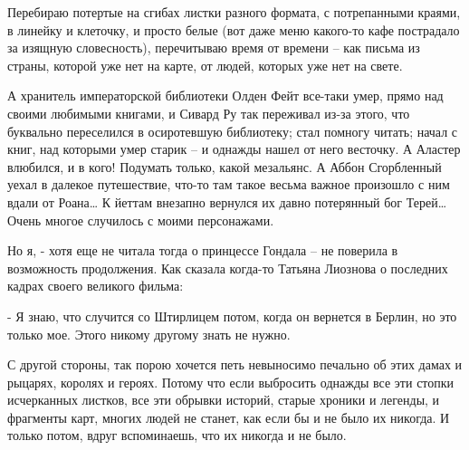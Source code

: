 Перебираю потертые на сгибах листки разного формата, с потрепанными краями, в
линейку и клеточку, и просто белые (вот даже меню какого-то кафе пострадало за
изящную словесность), перечитываю время от времени – как письма из страны,
которой уже нет на карте, от людей, которых уже нет на свете.

А хранитель императорской библиотеки Олден Фейт все-таки умер, прямо над своими
любимыми книгами, и Сивард Ру так переживал из-за этого, что буквально
переселился в осиротевшую библиотеку; стал помногу читать; начал с книг, над
которыми умер старик – и однажды нашел от него весточку. А Аластер влюбился, и
в кого! Подумать только, какой мезальянс. А Аббон Сгорбленный уехал в далекое
путешествие, что-то там такое весьма важное произошло с ним вдали от Роана… К
йеттам внезапно вернулся их давно потерянный бог Терей… Очень многое случилось
с моими персонажами.

Но я, - хотя еще не читала тогда о принцессе Гондала – не поверила в
возможность продолжения. Как сказала когда-то Татьяна Лиознова о последних
кадрах своего великого фильма: 

- Я знаю, что случится со Штирлицем потом, когда он вернется в Берлин, но это
только мое. Этого никому другому знать не нужно.

С другой стороны, так порою хочется петь невыносимо печально об этих дамах и
рыцарях, королях и героях. Потому что если выбросить однажды все эти стопки
исчерканных листков, все эти обрывки историй, старые хроники и легенды, и
фрагменты  карт, многих людей не станет, как если бы и не было их никогда. И
только потом, вдруг вспоминаешь, что их никогда и не было.
